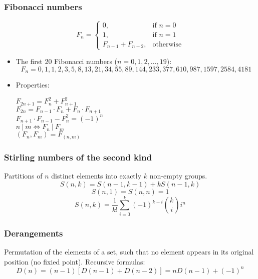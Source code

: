 \subsubsection{Fibonacci numbers}
\[ F_{n} =
	\begin{cases} 
		0, & \text{if } n = 0 \\ 
		1, & \text{if } n = 1 \\ 
		F_{n - 1} + F_{n - 2}, & \text{otherwise}
	\end{cases}
\]
\begin{itemize}
	\item The first 20 Fibonacci numbers ($n = 0, 1, 2, \ldots, 19$):
	\[ F_n = 0, 1, 1, 2, 3, 5, 8, 13, 21, 34, 55, 89, 144, 233, 377, 610, 987, 1597, 2584, 4181 \]
	\item Properties:
	\begin{multicols*}{2}
		$F_{2n + 1} = F_{n}^2 + F_{n + 1}^2$ \\ 
		$F_{2n} = F_{n - 1} \cdot F_{n} + F_{n} \cdot F_{n + 1}$ \\ 
		$F_{n + 1} \cdot F_{n - 1} - F_{n}^2 = (-1)^{n}$ \\ 
		$n\ |\ m \iff F_{n}\ |\ F_{m}$ \\ 
		$(F_{n}, F_{m}) = F_{(n, m)}$
	\end{multicols*}
\end{itemize}

\subsubsection{Stirling numbers of the second kind}
Partitions of $n$ distinct elements into exactly $k$ non-empty groups.
\[ S(n, k) = S(n - 1, k - 1) + kS(n - 1, k)\]
\[ S(n, 1) = S(n, n) = 1 \]
\[ S(n, k) = \frac{1}{k!} \sum\limits_{i = 0}^{k} (-1)^{k - i} {k \choose i} i^n\]

\subsubsection{Derangements}
Permutation of the elements of a set, such that no element appears in its original position (no fixied point). Recursive formulas:
\[D(n) = (n - 1)[D(n - 1) + D(n - 2)] = nD(n - 1) + (-1)^n\]
	
